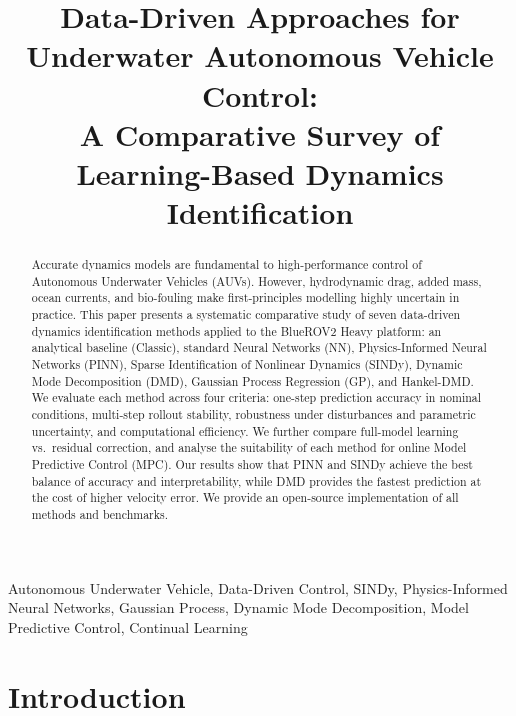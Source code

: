 \documentclass[conference]{IEEEtran}
\begin{document}
\title{Data-Driven Approaches for Underwater Autonomous Vehicle Control:\\
A Comparative Survey of Learning-Based Dynamics Identification}

\author{}

\maketitle

\begin{abstract}
Accurate dynamics models are fundamental to high-performance control of
Autonomous Underwater Vehicles (AUVs). However, hydrodynamic drag, added
mass, ocean currents, and bio-fouling make first-principles modelling highly
uncertain in practice. This paper presents a systematic comparative study
of seven data-driven dynamics identification methods applied to the BlueROV2
Heavy platform: an analytical baseline (Classic), standard Neural Networks
(NN), Physics-Informed Neural Networks (PINN), Sparse Identification of
Nonlinear Dynamics (SINDy), Dynamic Mode Decomposition (DMD), Gaussian Process
Regression (GP), and Hankel-DMD. We evaluate each method across four criteria:
one-step prediction accuracy in nominal conditions, multi-step rollout
stability, robustness under disturbances and parametric uncertainty, and
computational efficiency. We further compare full-model learning vs.\ residual
correction, and analyse the suitability of each method for online Model
Predictive Control (MPC). Our results show that PINN and SINDy achieve the
best balance of accuracy and interpretability, while DMD provides the fastest
prediction at the cost of higher velocity error. We provide an open-source
implementation of all methods and benchmarks.
\end{abstract}

\begin{IEEEkeywords}
Autonomous Underwater Vehicle, Data-Driven Control, SINDy, Physics-Informed Neural Networks,
Gaussian Process, Dynamic Mode Decomposition, Model Predictive Control, Continual Learning
\end{IEEEkeywords}

\section{Introduction}
\label{sec:intro}
\end{document}
